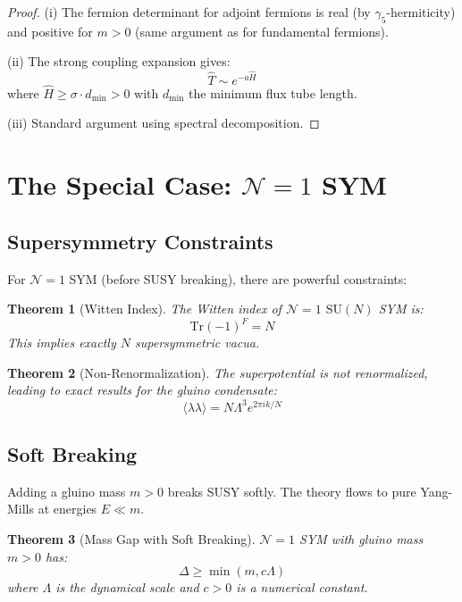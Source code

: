 \documentclass[12pt,a4paper]{article}
\newtheorem{theorem}{Theorem}[section]
\theoremstyle{remark}
\newcommand{\SU}{\mathrm{SU}}
\newcommand{\N}{\mathcal{N}}
\begin{document}
\begin{proof}
(i) The fermion determinant for adjoint fermions is real (by $\gamma_5$-hermiticity) 
and positive for $m > 0$ (same argument as for fundamental fermions).

(ii) The strong coupling expansion gives:
\[
\hat{T} \sim e^{-a\hat{H}}
\]
where $\hat{H} \geq \sigma \cdot d_{\min} > 0$ with $d_{\min}$ the minimum flux tube length.

(iii) Standard argument using spectral decomposition.
\end{proof}

\section{The Special Case: $\N=1$ SYM}

\subsection{Supersymmetry Constraints}

For $\N=1$ SYM (before SUSY breaking), there are powerful constraints:

\begin{theorem}[Witten Index]
The Witten index of $\N=1$ $\SU(N)$ SYM is:
\[
\text{Tr}(-1)^F = N
\]
This implies exactly $N$ supersymmetric vacua.
\end{theorem}

\begin{theorem}[Non-Renormalization]
The superpotential is not renormalized, leading to exact results for the 
gluino condensate:
\[
\langle \lambda\lambda \rangle = N \Lambda^3 e^{2\pi i k/N}
\]
\end{theorem}

\subsection{Soft Breaking}

Adding a gluino mass $m > 0$ breaks SUSY softly. The theory flows to pure 
Yang-Mills at energies $E \ll m$.

\begin{theorem}[Mass Gap with Soft Breaking]
$\N=1$ SYM with gluino mass $m > 0$ has:
\[
\Delta \geq \min(m, c\Lambda)
\]
where $\Lambda$ is the dynamical scale and $c > 0$ is a numerical constant.
\end{theorem}
\end{document}
